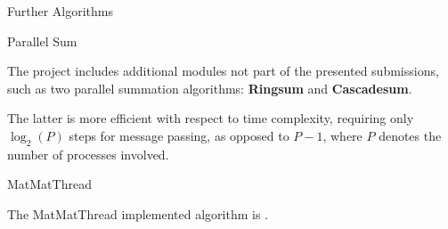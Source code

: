 \begin{chapter}{Further Algorithms}
    \begin{section}{Parallel Sum}
        \par The project includes additional modules not part of the presented submissions, such as two parallel summation algorithms: \textbf{Ringsum} and \textbf{Cascadesum}.
        \par The latter is more efficient with respect to time complexity, requiring only $\log_2(P)$ steps for message passing, as opposed to $P - 1$, where $P$ denotes the number of processes involved.
    \end{section}
    \begin{section}{MatMatThread}
        \par The MatMatThread implemented algorithm is .
    \end{section}
\end{chapter}